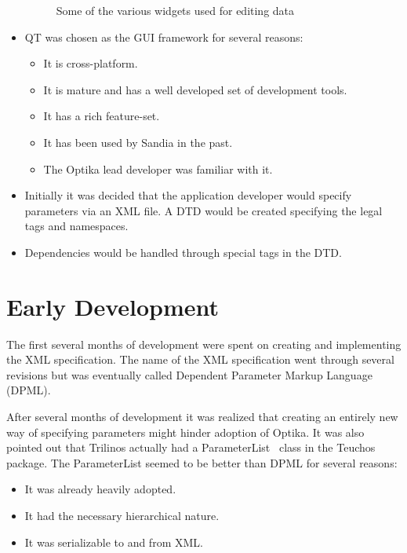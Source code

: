 \begin{itemize}
\begin{figure}[h]
{			}
			\caption{Some of the various widgets used for editing data}
			\label{editingWidgets}
		\end{figure}

		\item QT was chosen as the GUI framework for several reasons:
			\begin{itemize}
				\item It is cross-platform.
				\item It is mature and has a well developed set of
				development tools.
				\item It has a rich feature-set.
				\item It has been used by Sandia in the past.
				\item The Optika lead developer was familiar with it.
			\end{itemize}
		\item Initially it was decided that the application developer would
		specify parameters via an XML file. A DTD would be created specifying
		the legal tags and namespaces.
		\item Dependencies would be handled through special tags in the DTD.
	\end{itemize}

\section{Early Development}
The first several months of development were spent on creating and implementing the XML
specification. The name of the XML specification went through several revisions but was
eventually called Dependent Parameter Markup Language (DPML).

After several months of development it was realized that creating an entirely new way of specifying 
parameters might hinder adoption of Optika. It was also pointed out that Trilinos actually had
a ParameterList~\cite{ParameterList} class in the Teuchos package. The ParameterList seemed to be better than DPML for
several reasons:
	\begin{itemize}
		\item It was already heavily adopted.
		\item It had the necessary hierarchical nature.
		\item It was serializable to and from XML.
	\end{itemize}

